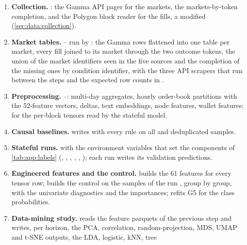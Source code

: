 \begin{enumerate}[nosep]
  \item \textbf{Collection.}  : the
  Gamma API pager for the markets, the markets-by-token completion, and the Polygon block
  reader for the fills, a modified  \cite{martkir2026polytradescan}
  (\cref{sec:data:collection}).
  \item \textbf{Market tables.}  -- run by
  : the Gamma rows flattened into
  one table per market, every fill joined to its market through the two outcome tokens,
  the union of the market identifiers seen in the five sources and the completion of the
  missing ones by condition identifier, with the three API scrapers that run between the
  steps and the expected row counts in .
  \item \textbf{Preprocessing.}  --: multi-day
  aggregates, hourly order-book partitions with the 52-feature vectors, deltas, text
  embeddings, node features, wallet features;  for the
  per-block tensors read by the stateful model.
  \item \textbf{Causal baselines.}     writes
   with every rule on all and deduplicated samples.
  \item \textbf{Stateful runs.}     with the
  environment variables that set the components of \cref{tab:app:labels} (,
  , , , , ); each run writes
  its validation predictions.
  \item \textbf{Engineered features and the control.}   builds the 61
  features for every tensor row; 
  builds the control on the samples of the run , group by group, with the
  univariate diagnostics and the importances;
    refits G5 for the class probabilities.
  \item \textbf{Data-mining study.}   
   reads the feature parquets of the previous step and writes, per horizon, the PCA,
  correlation, random-projection, MDS, UMAP and t-SNE outputs, the LDA, logistic, kNN, tree

\end{enumerate}
